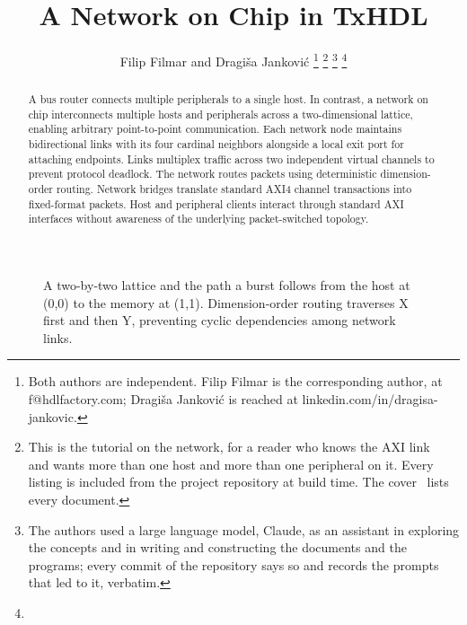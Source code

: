 \documentclass[journal,9pt]{IEEEtran}
\title{A Network on Chip in TxHDL}
\author{Filip Filmar and Dragiša Janković%
\thanks{Both authors are independent. Filip Filmar is the
corresponding author, at f@hdlfactory.com; Dragiša Janković is
reached at linkedin.com/in/dragisa-jankovic.}%
\thanks{This is the tutorial on the network, for a reader who knows
the AXI link~\cite{axi} and wants more than one host and more than
one peripheral on it. Every listing is included from the project
repository \code{HDL/txhdl} at build time. The cover~\cite{cover}
lists every document.}%
\thanks{The authors used a large language model, Claude, as an
assistant in exploring the concepts and in writing and constructing
the documents and the programs; every commit of the repository says
so and records the prompts that led to it, verbatim.}%
\thanks{\buildstamp}}
\begin{document}
\maketitle

\begin{abstract}
A bus router connects multiple peripherals to a single host. In contrast,
a network on chip interconnects multiple hosts and peripherals across a
two-dimensional lattice, enabling arbitrary point-to-point communication.
Each network node maintains bidirectional links with its four cardinal
neighbors alongside a local exit port for attaching endpoints. Links
multiplex traffic across two independent virtual channels to prevent
protocol deadlock. The network routes packets using deterministic
dimension-order routing. Network bridges translate standard AXI4 channel
transactions into fixed-format packets. Host and peripheral clients interact
through standard AXI interfaces without awareness of the underlying
packet-switched topology.
\end{abstract}


\begin{figure}[htbp]
\centering
{}
\caption{A two-by-two lattice and the path a burst follows from the host
at (0,0) to the memory at (1,1). Dimension-order routing traverses X
first and then Y, preventing cyclic dependencies among network links.}
\label{fig:n-lattice}
\end{figure}
\end{document}
